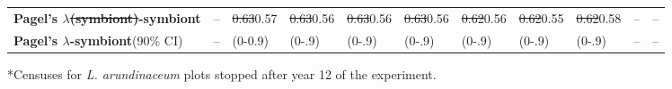 \documentclass[lineno, sn-basic]{sn-jnl}%
\providecommand{\DIFadd}[1]{{\protect\color{blue}#1}} %
\providecommand{\DIFdel}[1]{{\protect\color{red}\protect\scriptsize\sout{#1}}}
\providecommand{\DIFadd}[1]{{\protect\color{blue}\uwave{#1}}} %
\providecommand{\DIFdel}[1]{{\protect\color{red}\sout{#1}}}                      %
\providecommand{\DIFaddbegin}{} %
\providecommand{\DIFaddend}{} %
\providecommand{\DIFdelbegin}{} %
\providecommand{\DIFdelend}{} %
\newcommand{\DIFscaledelfig}{0.5}
\newlength{\DIFdelgraphicswidth} %
\newlength{\DIFdelgraphicsheight} %
\newcommand{\DIFaddincludegraphics}[2][]{{\color{blue}\fbox{\DIFOincludegraphics[#1]{#2}}}} %
\newcommand{\DIFdelincludegraphics}[2][]{%
\sbox{\DIFdelgraphicsbox}{\DIFOincludegraphics[#1]{#2}}%
\settoboxwidth{\DIFdelgraphicswidth}{\DIFdelgraphicsbox} %
\settoboxtotalheight{\DIFdelgraphicsheight}{\DIFdelgraphicsbox} %
\scalebox{\DIFscaledelfig}{%
\parbox[b]{\DIFdelgraphicswidth}{\usebox{\DIFdelgraphicsbox}\\[-\baselineskip] \rule{\DIFdelgraphicswidth}{0em}}\llap{\resizebox{\DIFdelgraphicswidth}{\DIFdelgraphicsheight}{%
\setlength{\unitlength}{\DIFdelgraphicswidth}%
\begin{picture}(1,1)%
\thicklines\linethickness{2pt} %
{\color[rgb]{1,0,0}\put(0,0){\framebox(1,1){}}}%
{\color[rgb]{1,0,0}\put(0,0){\line( 1,1){1}}}%
{\color[rgb]{1,0,0}\put(0,1){\line(1,-1){1}}}%
\end{picture}%
}\hspace*{3pt}}} %
} %
\DeclareRobustCommand{\DIFaddbegin}{\DIFOaddbegin \let\includegraphics\DIFaddincludegraphics} %
\DeclareRobustCommand{\DIFaddend}{\DIFOaddend \let\includegraphics\DIFOincludegraphics} %
\DeclareRobustCommand{\DIFdelbegin}{\DIFOdelbegin \let\includegraphics\DIFdelincludegraphics} %
\DeclareRobustCommand{\DIFdelend}{\DIFOaddend \let\includegraphics\DIFOincludegraphics} %
\begin{document}
\begin{table}
\begin{tabular}{lp{2cm}p{1.7cm}p{1.5cm}p{1cm}p{1.2cm}p{1.2cm}p{.9cm}p{1.2cm}p{1.5cm}p{1.6cm}}
		\textbf{Pagel's $\lambda$\DIFdelbegin \DIFdel{(symbiont)}\DIFdelend \DIFaddbegin \DIFadd{-symbiont}\DIFaddend }&--&\DIFdelbegin \DIFdel{0.63}\DIFdelend \DIFaddbegin \DIFadd{0.57}\DIFaddend &\DIFdelbegin \DIFdel{0.63}\DIFdelend \DIFaddbegin \DIFadd{0.56}\DIFaddend &\DIFdelbegin \DIFdel{0.63}\DIFdelend \DIFaddbegin \DIFadd{0.56}\DIFaddend &\DIFdelbegin \DIFdel{0.63}\DIFdelend \DIFaddbegin \DIFadd{0.56}\DIFaddend &\DIFdelbegin \DIFdel{0.62}\DIFdelend \DIFaddbegin \DIFadd{0.56}\DIFaddend &\DIFdelbegin \DIFdel{0.62}\DIFdelend \DIFaddbegin \DIFadd{0.55}\DIFaddend &\DIFdelbegin \DIFdel{0.62}\DIFdelend \DIFaddbegin \DIFadd{0.58}\DIFaddend &--&--\\
		\DIFaddbegin \textbf{\DIFadd{Pagel's $\lambda$-symbiont}}\DIFadd{(90\% CI)}&\DIFadd{--}&\DIFadd{(0-0.9)}&\DIFadd{(0-.9)}&\DIFadd{(0-.9)}&\DIFadd{(0-.9)}&\DIFadd{(0-.9)}&\DIFadd{(0-.9)}&\DIFadd{(0-.9)}&\DIFadd{--}&\DIFadd{--}\\
		\DIFaddend \bottomrule

	\end{tabular}
	\raggedright\footnotesize{*Censuses for \emph{L. arundinaceum} plots stopped after year 12 of the experiment.}
\end{table}
\bigskip
\end{document}
